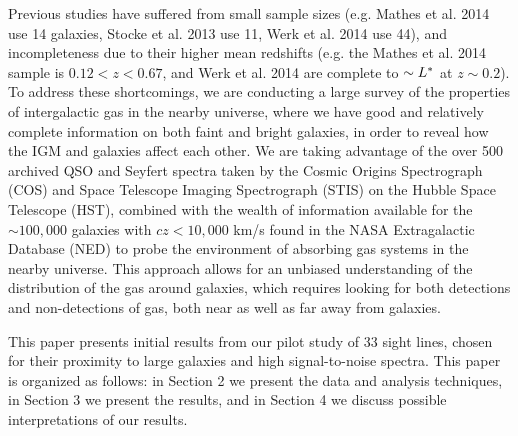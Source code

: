 \documentclass[iop]{emulateapj-rtx4}
\begin{document}
Previous studies have suffered from small sample sizes (e.g. Mathes et al. 2014 use 14 galaxies, Stocke et al. 2013 use 11, Werk et al. 2014 use 44), and incompleteness due to their higher mean redshifts (e.g. the Mathes et al. 2014 sample is $0.12 <z<0.67$, and Werk et al. 2014 are complete to $\sim L^{\**}$ at $z\sim0.2$). To address these shortcomings, we are conducting a large survey of the properties of intergalactic gas in the nearby universe, where we have good and relatively complete information on both faint and bright galaxies, in order to reveal how the IGM and galaxies affect each other. We are taking advantage of the over 500 archived QSO and Seyfert spectra taken by the Cosmic Origins Spectrograph (COS) and Space Telescope Imaging Spectrograph (STIS) on the Hubble Space Telescope (HST), combined with the wealth of information available for the $\sim100,000$ galaxies with $cz<10,000$ km/s found in the NASA Extragalactic Database (NED) to probe the environment of absorbing gas systems in the nearby universe. This approach allows for an unbiased understanding of the distribution of the gas around galaxies, which requires looking for both detections and non-detections of gas, both near as well as far away from galaxies.

This paper presents initial results from our pilot study of 33 sight lines, chosen for their proximity to large galaxies and high signal-to-noise spectra. This paper is organized as follows: in Section 2 we present the data and analysis techniques, in Section 3 we present the results, and in Section 4 we discuss possible interpretations of our results.


\end{document}
